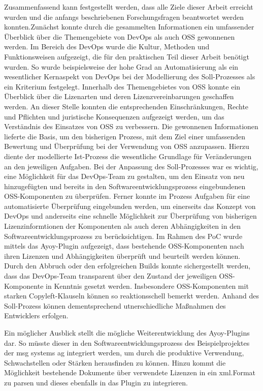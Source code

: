 Zusammenfassend kann festgestellt werden, dass alle Ziele dieser Arbeit erreicht wurden und die anfangs beschriebenen Forschungsfragen beantwortet werden konnten.Zunächst konnte durch die gesammelten Informationen ein umfassender Überblick über die Themengebiete von DevOps als auch OSS gewonnenen werden. Im Bereich des DevOps wurde die Kultur, Methoden und Funktionsweisen aufgezeigt, die für den praktischen Teil dieser Arbeit benötigt wurden. So wurde beispielsweise der hohe Grad an Automatisierung als ein wesentlicher Kernaspekt von DevOps bei der Modellierung des Soll-Prozesses als ein Kriterium festgelegt. Innerhalb des Themengebietes von OSS konnte ein Überblick über die Lizenarten und deren Lizenzvereinbarungen geschaffen werden. An dieser Stelle konnten die entsprechenden Einschränkungen, Rechte und Pflichten und juristische Konsequenzen aufgezeigt werden, um das Verständnis des Einsatzes von OSS zu verbessern. Die gewonnenen Informationen lieferte die Basis, um den bisherigen Prozess, mit dem Ziel einer umfassenden Bewertung und Überprüfung bei der Verwendung von OSS anzupassen. Hierzu diente der modellierte Ist-Prozess die wesentliche Grundlage für Veränderungen an den jeweiligen Aufgaben. Bei der Anpassung des Soll-Prozesses war es wichtig, eine Möglichkeit für das DevOps-Team zu gestalten, um den Einsatz von neu hinzugefügten und bereits in den Softwareentwicklungsprozess eingebundenen OSS-Komponenten zu überprüfen.
Ferner konnte im Prozess Aufgaben für eine automatisierte Überprüfung eingebunden werden, um einerseits das Konzept von DevOps und anderseits eine schnelle Möglichkeit zur Überprüfung von bisherigen Lizenzinformtionen der Komponenten als auch deren Abhängigkeiten in den Softwareentwicklungsprozess zu berücksichtigen. Im Rahmen des PoC wurde mittels das Ayoy-Plugin aufgezeigt, dass bestehende OSS-Komponenten nach ihren Lizenzen und Abhängigkeiten überprüft und beurteilt werden können. Durch den Abbruch oder den erfolgreichen Builds konnte sichergestellt werden, dass das DevOps-Team transparent über den Zustand der jeweiligen OSS-Komponente in Kenntnis gesetzt werden. Insbesondere OSS-Komponenten mit starken Copyleft-Klauseln können so reaktionsschell bemerkt werden. Anhand des Soll-Prozess können dementsprechend utnerschiedliche Maßnahmen des Entwicklers erfolgen.


Ein möglicher Ausblick stellt die mögliche Weiterentwicklung des Ayoy-Plugins dar. So müsste dieser in den Softwareentwicklungsprozess des Beispielprojektes der msg systems ag integriert werden, um durch die produktive Verwendung, Schwachstellen oder Stärken herausfinden zu können. Hinzu kommt die Möglichkeit bestehende Dokumente über verwendete Lizenzen in ein xml.Format zu parsen und dieses ebenfalls in das Plugin zu integrieren. 
